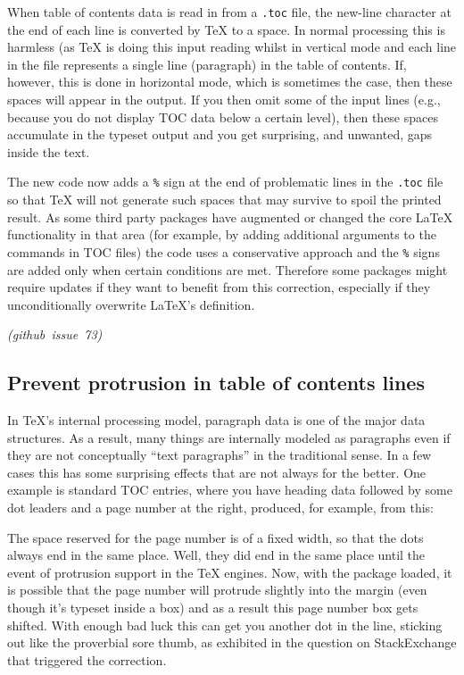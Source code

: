 \documentclass{ltnews}
\newcommand\githubissue[2][]{\ifhmode\unskip\fi
     \quad\penalty500\strut\nobreak\hfill
     \mbox{\small\itshape(github issue#1 #2)}\par}
\begin{document}
When table of contents data is read in from a \texttt{.toc} file, the
new-line character at the end of each line is converted by \TeX{} to a
space. In normal processing this is harmless (as \TeX{} is doing this
input reading whilst in vertical mode and each line in the file
represents a single line (paragraph) in the table of contents. If,
however, this is done in horizontal mode, which is sometimes the case,
then these spaces will appear in the output. If you then omit some of
the input lines (e.g., because you do not display TOC data below a
certain level), then these spaces accumulate in the typeset output and
you get surprising, and unwanted, gaps inside the text.

The new code now adds a \texttt{\%} sign at the end of problematic
lines in the \texttt{.toc} file so that \TeX{} will not generate such
spaces that may survive to spoil the printed result. As some third
party packages have augmented or changed the core \LaTeX{}
functionality in that area (for example, by adding additional
arguments to the commands in TOC files) the code uses a conservative
approach and the \texttt{\%} signs are added only when certain
conditions are met.  Therefore some packages might require updates if
they want to benefit from this correction, especially if they
unconditionally overwrite \LaTeX{}'s  definition.
%
\githubissue{73}


\subsection{Prevent protrusion in table of contents lines}

In \TeX{}'s internal processing model,
paragraph data is one of the
major data structures. As a result,
many things are internally modeled
as paragraphs even if they are not conceptually
``text paragraphs'' in
the traditional sense. 
In a few cases this has some surprising effects
that are not always
for the better. One example is
standard TOC entries,
where you have
heading data followed by some dot leaders and a page
number at the right, produced, for example, from this:
\begin{quote}
\end{quote}
The space reserved for the page number is of a fixed width, so that
the dots always end in the same place. Well, they did end in the same
place until the event of protrusion support in the \TeX{} engines.
Now, with the  package loaded, it is possible that the
page number will protrude slightly into the margin (even though it’s
typeset inside a box) and as a result this page number box gets
shifted. With enough bad luck this can get you another dot in the
line, sticking out like the proverbial sore thumb, as exhibited in the
question on StackExchange that triggered the correction.
\end{document}
